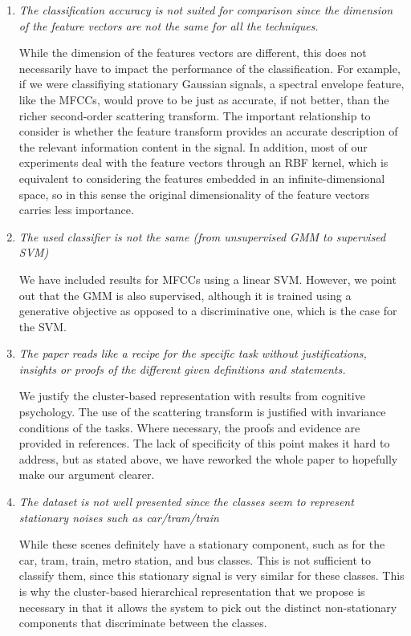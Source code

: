 \documentclass[10pt]{article}
\begin{document}
\begin{enumerate}
\item \emph{The classification accuracy is not suited for comparison since the dimension of the feature vectors are not the same for all the techniques.}

While the dimension of the features vectors are different, this does not necessarily have to impact the performance of the classification. For example, if we were classifiying stationary Gaussian signals, a spectral envelope feature, like the MFCCs, would prove to be just as accurate, if not better, than the richer second-order scattering transform. The important relationship to consider is whether the feature transform provides an accurate description of the relevant information content in the signal. In addition, most of our experiments deal with the feature vectors through an RBF kernel, which is equivalent to considering the features embedded in an infinite-dimensional space, so in this sense the original dimensionality of the feature vectors carries less importance.

\item \emph{The used classifier is not the same (from unsupervised GMM to supervised SVM)}

We have included results for MFCCs using a linear SVM. However, we point out that the GMM is also supervised, although it is trained using a generative objective as opposed to a discriminative one, which is the case for the SVM.

\item \emph{The paper reads like a recipe for the specific task without justifications, insights or proofs of the different given definitions and statements.}

We justify the cluster-based representation with results from cognitive psychology. The use of the scattering transform is justified with invariance conditions of the tasks. Where necessary, the proofs and evidence are provided in references. The lack of specificity of this point makes it hard to address, but as stated above, we have reworked the whole paper to hopefully make our argument clearer.

\item \emph{The dataset is not well presented since the classes seem to represent stationary noises such as car/tram/train}

While these scenes definitely have a stationary component, such as for the car, tram, train, metro station, and bus classes. This is not sufficient to classify them, since this stationary signal is very similar for these classes. This is why the cluster-based hierarchical representation that we propose is necessary in that it allows the system to pick out the distinct non-stationary components that discriminate between the classes.


\end{enumerate}
\end{document}
